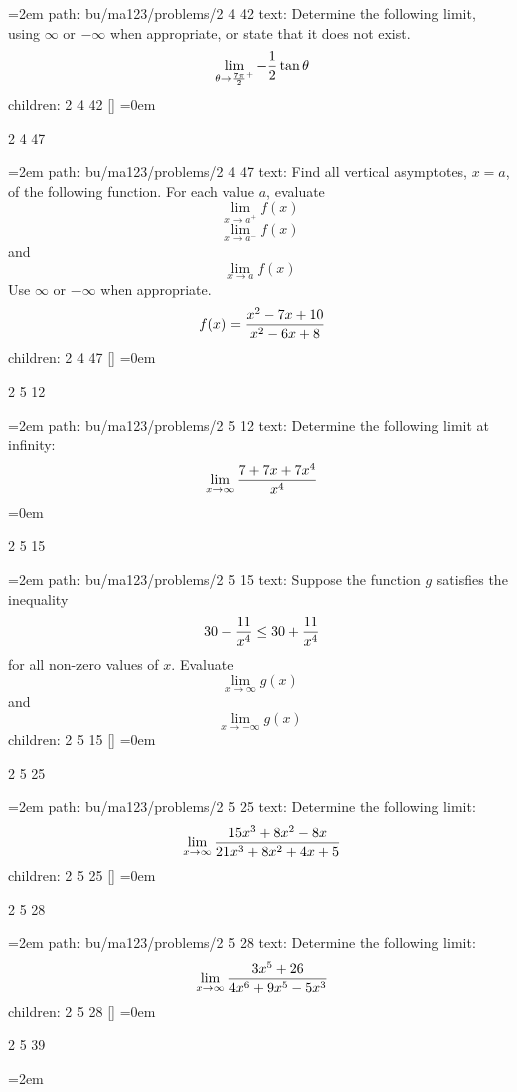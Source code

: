 \leftskip=2em
path: bu/ma123/problems/2 4 42
\smallskip
text:  Determine the following limit, using $\infty$ or $-\infty$ when appropriate, or state that it does not exist. $$\ \lim_{\theta \to {7\pi \over 2}^{+}}-{ 1 \over 2 }\tan \theta $$
\smallskip
children: 2 4 42 []
\smallskip
\leftskip=0em
\par\endgroup
\bigskip
{}
2 4 47
\smallskip
\par\begingroup
\leftskip=2em
path: bu/ma123/problems/2 4 47
\smallskip
text:  Find all vertical asymptotes, $x = a$, of the following function. For each value $a$, evaluate $$\lim_{x \to a^{+}}{f(x)}$$ $$\lim_{x \to a^{-}}{f(x)}$$ and $$\lim_{x \to a}{f(x)}$$ Use $\infty$ or $-\infty$ when appropriate. $$\ f(x) = { x^2 - 7x + 10 \over x^2 - 6x + 8 } $$
\smallskip
children: 2 4 47 []
\smallskip
\leftskip=0em
\par\endgroup
\bigskip
{}
2 5 12
\smallskip
\par\begingroup
\leftskip=2em
path: bu/ma123/problems/2 5 12
\smallskip
text:  Determine the following limit at infinity: $$\ \lim_{x \to \infty}{ 7 + 7x + 7x^4 \over x^4 } $$
\smallskip
\leftskip=0em
\par\endgroup
\bigskip
{}
2 5 15
\smallskip
\par\begingroup
\leftskip=2em
path: bu/ma123/problems/2 5 15
\smallskip
text:  Suppose the function $g$ satisfies the inequality $$\ 30 - {11 \over x^4} \le 30 + {11 \over x^4} $$ for all non-zero values of $x$. Evaluate $$\lim_{x \to \infty}{g(x)}$$ and $$\lim_{x \to -\infty}{g(x)}$$
\smallskip
children: 2 5 15 []
\smallskip
\leftskip=0em
\par\endgroup
\bigskip
{}
2 5 25
\smallskip
\par\begingroup
\leftskip=2em
path: bu/ma123/problems/2 5 25
\smallskip
text:  Determine the following limit: $$\ \lim_{x \to \infty}{ 15x^3 + 8x^2 - 8x \over 21x^3 + 8x^2 + 4x + 5 } $$
\smallskip
children: 2 5 25 []
\smallskip
\leftskip=0em
\par\endgroup
\bigskip
{}
2 5 28
\smallskip
\par\begingroup
\leftskip=2em
path: bu/ma123/problems/2 5 28
\smallskip
text:  Determine the following limit: $$\ \lim_{x \to \infty} { 3x^5 + 26 \over 4x^6 + 9x^5 - 5x^3 } $$
\smallskip
children: 2 5 28 []
\smallskip
\leftskip=0em
\par\endgroup
\bigskip
{}
2 5 39
\smallskip
\par\begingroup
\leftskip=2em
